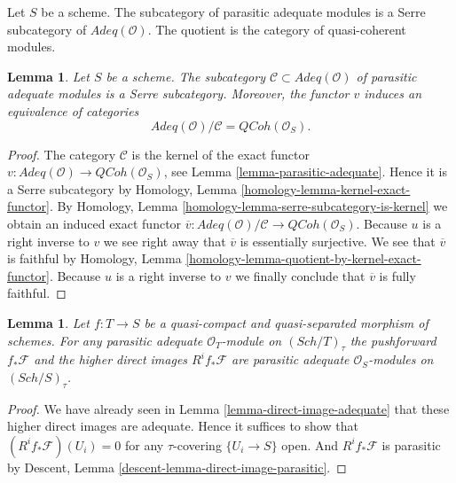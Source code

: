 \documentclass{stacks-project}
\theoremstyle{plain}
\newtheorem{lemma}[subsection]{Lemma}
\theoremstyle{definition}
\theoremstyle{remark}
\numberwithin{equation}{subsection}
\def\Sch{\mathit{Sch}}
\def\QCoh{\mathit{QCoh}}
\begin{document}
\noindent
Let $S$ be a scheme.
The subcategory of parasitic adequate modules is a Serre subcategory of
$\textit{Adeq}(\mathcal{O})$. The quotient is the category of
quasi-coherent modules.

\begin{lemma}
\label{lemma-adequate-by-parasitic}
Let $S$ be a scheme. The subcategory
$\mathcal{C} \subset \textit{Adeq}(\mathcal{O})$ of parasitic adequate
modules is a Serre subcategory. Moreover, the functor $v$ induces
an equivalence of categories
$$
\textit{Adeq}(\mathcal{O}) / \mathcal{C} = \QCoh(\mathcal{O}_S).
$$
\end{lemma}

\begin{proof}
The category $\mathcal{C}$ is the kernel of the exact functor
$v : \textit{Adeq}(\mathcal{O}) \to \QCoh(\mathcal{O}_S)$, see
Lemma \ref{lemma-parasitic-adequate}.
Hence it is a Serre subcategory by
Homology, Lemma \ref{homology-lemma-kernel-exact-functor}.
By
Homology, Lemma \ref{homology-lemma-serre-subcategory-is-kernel}
we obtain an induced exact functor
$\overline{v} :
\textit{Adeq}(\mathcal{O}) / \mathcal{C}
\to
\QCoh(\mathcal{O}_S)$.
Because $u$ is a right inverse to $v$ we see right away that
$\overline{v}$ is essentially surjective.
We see that $\overline{v}$ is faithful by
Homology, Lemma \ref{homology-lemma-quotient-by-kernel-exact-functor}.
Because $u$ is a right inverse to $v$ we finally conclude that
$\overline{v}$ is fully faithful.
\end{proof}

\begin{lemma}
\label{lemma-direct-image-parasitic-adequate}
Let $f : T \to S$ be a quasi-compact and quasi-separated morphism
of schemes. For any parasitic adequate $\mathcal{O}_T$-module on
$(\Sch/T)_\tau$ the pushforward
$f_*\mathcal{F}$ and the higher direct images $R^if_*\mathcal{F}$
are parasitic adequate $\mathcal{O}_S$-modules on $(\Sch/S)_\tau$.
\end{lemma}

\begin{proof}
We have already seen in
Lemma \ref{lemma-direct-image-adequate}
that these higher direct images are adequate.
Hence it suffices to show that
$(R^if_*\mathcal{F})(U_i) = 0$ for any $\tau$-covering
$\{U_i \to S\}$ open. And $R^if_*\mathcal{F}$
is parasitic by
Descent, Lemma \ref{descent-lemma-direct-image-parasitic}.
\end{proof}
\end{document}
